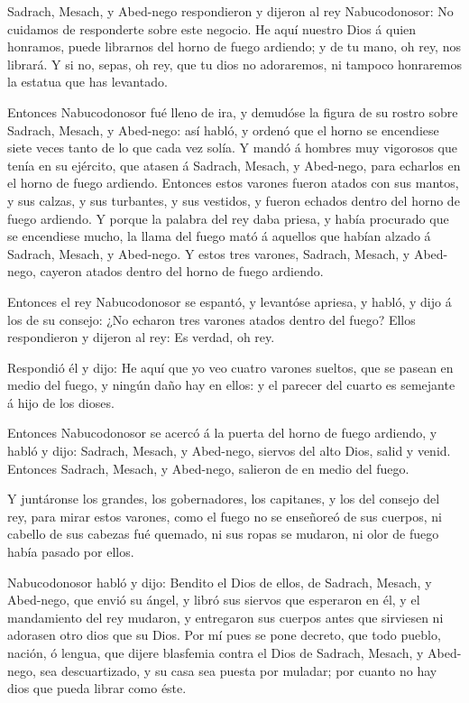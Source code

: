  Sadrach, Mesach, y Abed-nego respondieron y dijeron al rey
Nabucodonosor: No cuidamos de responderte sobre este negocio.
 He aquí nuestro Dios á quien honramos, puede librarnos del
horno de fuego ardiendo; y de tu mano, oh rey, nos librará.
 Y si no, sepas, oh rey, que tu dios no adoraremos, ni
tampoco honraremos la estatua que has levantado.

 Entonces Nabucodonosor fué lleno de ira, y demudóse la
figura de su rostro sobre Sadrach, Mesach, y Abed-nego: así habló, y
ordenó que el horno se encendiese siete veces tanto de lo que cada vez
solía.  Y mandó á hombres muy vigorosos que tenía en su
ejército, que atasen á Sadrach, Mesach, y Abed-nego, para echarlos en el
horno de fuego ardiendo.  Entonces estos varones fueron
atados con sus mantos, y sus calzas, y sus turbantes, y sus vestidos, y
fueron echados dentro del horno de fuego ardiendo.  Y
porque la palabra del rey daba priesa, y había procurado que se
encendiese mucho, la llama del fuego mató á aquellos que habían alzado á
Sadrach, Mesach, y Abed-nego.  Y estos tres varones,
Sadrach, Mesach, y Abed-nego, cayeron atados dentro del horno de fuego
ardiendo.

 Entonces el rey Nabucodonosor se espantó, y levantóse
apriesa, y habló, y dijo á los de su consejo: ¿No echaron tres varones
atados dentro del fuego? Ellos respondieron y dijeron al rey: Es verdad,
oh rey.

 Respondió él y dijo: He aquí que yo veo cuatro varones
sueltos, que se pasean en medio del fuego, y ningún daño hay en ellos: y
el parecer del cuarto es semejante á hijo de los dioses.

 Entonces Nabucodonosor se acercó á la puerta del horno de
fuego ardiendo, y habló y dijo: Sadrach, Mesach, y Abed-nego, siervos
del alto Dios, salid y venid. Entonces Sadrach, Mesach, y Abed-nego,
salieron de en medio del fuego.

 Y juntáronse los grandes, los gobernadores, los capitanes,
y los del consejo del rey, para mirar estos varones, como el fuego no se
enseñoreó de sus cuerpos, ni cabello de sus cabezas fué quemado, ni sus
ropas se mudaron, ni olor de fuego había pasado por ellos.

 Nabucodonosor habló y dijo: Bendito el Dios de ellos, de
Sadrach, Mesach, y Abed-nego, que envió su ángel, y libró sus siervos
que esperaron en él, y el mandamiento del rey mudaron, y entregaron sus
cuerpos antes que sirviesen ni adorasen otro dios que su Dios.
 Por mí pues se pone decreto, que todo pueblo, nación, ó
lengua, que dijere blasfemia contra el Dios de Sadrach, Mesach, y
Abed-nego, sea descuartizado, y su casa sea puesta por muladar; por
cuanto no hay dios que pueda librar como éste.

